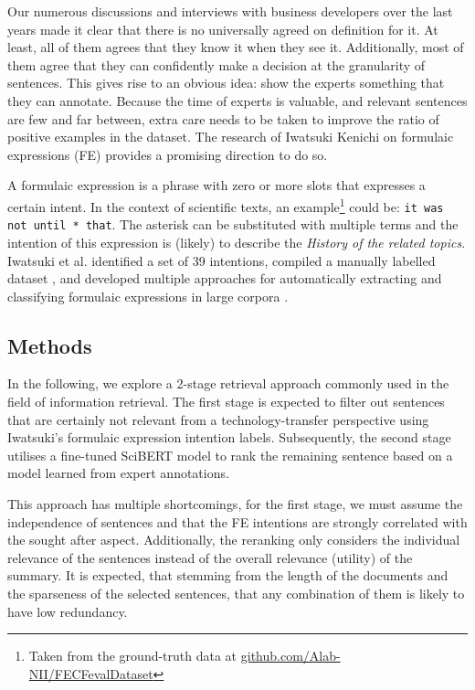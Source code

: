 Our numerous discussions and interviews with business developers over the last years made it clear that there is no universally agreed on definition for it. At least, all of them agrees that they know it when they see it. Additionally, most of them agree that they can confidently make a decision at the granularity of sentences. This gives rise to an obvious idea: show the experts something that they can annotate. Because the time of experts is valuable, and relevant sentences are few and far between, extra care needs to be taken to improve the ratio of positive examples in the dataset. The research of Iwatsuki Kenichi on formulaic expressions (FE) \cite{iwatsuki2020evaluation,iwatsuki2021extraction,iwatsuki2021communicative,iwatsuki2022extraction} provides a promising direction to do so. 

A formulaic expression is a phrase with zero or more slots that expresses a certain intent. In the context of scientific texts, an example\footnote{Taken from the ground-truth data at \href{https://github.com/Alab-NII/FECFevalDataset/blob/master/human_evaluation/background.tsv}{github.com/Alab-NII/FECFevalDataset}} could be: \texttt{it was not until * that}. The asterisk can be substituted with multiple terms and the intention of this expression is (likely) to describe the \textit{History of the related topics}. Iwatsuki et al. identified a set of 39 intentions, compiled a manually labelled dataset \cite{iwatsuki2020evaluation}, and developed multiple approaches for automatically extracting and classifying formulaic expressions in large corpora \cite{iwatsuki2021communicative,iwatsuki2022extraction}.

\subsection{Methods}

In the following, we explore a 2-stage retrieval approach \cite{schutze2008introduction} commonly used in the field of information retrieval. The first stage is expected to filter out sentences that are certainly not relevant from a technology-transfer perspective using Iwatsuki's formulaic expression intention labels. Subsequently, the second stage utilises a fine-tuned SciBERT model to rank the remaining sentence based on a model learned from expert annotations.

This approach has multiple shortcomings, for the first stage, we must assume the independence of sentences and that the FE intentions are strongly correlated with the sought after aspect. Additionally, the reranking only considers the individual relevance of the sentences instead of the overall relevance (utility) of the summary. It is expected, that stemming from the length of the documents and the sparseness of the selected sentences, that any combination of them is likely to have low redundancy.

